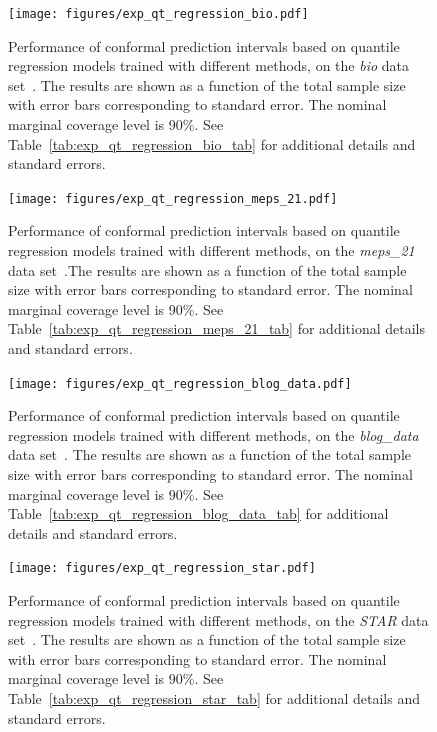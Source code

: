 \begin{figure}[!htb]
    \centering
    \texttt{[image: figures/exp\_qt\_regression\_bio.pdf]}
    \caption{Performance of conformal prediction intervals based on quantile regression models trained with different methods, on the {\em bio} data set~\cite{data-bio}. The results are shown as a function of the total sample size with error bars corresponding to standard error. The nominal marginal coverage level is 90\%. See Table~\ref{tab:exp_qt_regression_bio_tab} for additional details and standard errors.}
    \label{fig:exp_qt_regression_bio}
\end{figure}

\begin{figure}[!htb]
    \centering
    \texttt{[image: figures/exp\_qt\_regression\_meps\_21.pdf]}
    \caption{Performance of conformal prediction intervals based on quantile regression models trained with different methods, on the {\em meps\_21} data set~\cite{meps_21}.The results are shown as a function of the total sample size with error bars corresponding to standard error. The nominal marginal coverage level is 90\%. See Table~\ref{tab:exp_qt_regression_meps_21_tab} for additional details and standard errors.}
    \label{fig:exp_qt_regression_meps_21}
\end{figure}

\begin{figure}[!htb]
    \centering
    \texttt{[image: figures/exp\_qt\_regression\_blog\_data.pdf]}
    \caption{Performance of conformal prediction intervals based on quantile regression models trained with different methods, on the {\em blog\_data} data set~\cite{blog_data}. The results are shown as a function of the total sample size with error bars corresponding to standard error. The nominal marginal coverage level is 90\%. See Table~\ref{tab:exp_qt_regression_blog_data_tab} for additional details and standard errors.}
    \label{fig:exp_qt_regression_blog_data}
\end{figure}

\begin{figure}[!htb]
    \centering
    \texttt{[image: figures/exp\_qt\_regression\_star.pdf]}
    \caption{Performance of conformal prediction intervals based on quantile regression models trained with different methods, on the {\em STAR} data set~\cite{star}. The results are shown as a function of the total sample size with error bars corresponding to standard error. The nominal marginal coverage level is 90\%. See Table~\ref{tab:exp_qt_regression_star_tab} for additional details and standard errors.}
    \label{fig:exp_qt_regression_star}
\end{figure}

